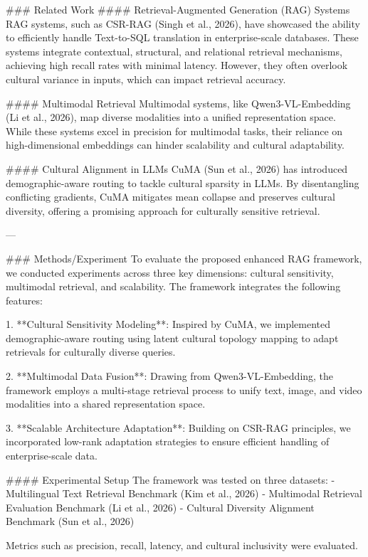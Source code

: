 ### Related Work  
#### Retrieval-Augmented Generation (RAG) Systems  
RAG systems, such as CSR-RAG (Singh et al., 2026), have showcased the ability to efficiently handle Text-to-SQL translation in enterprise-scale databases. These systems integrate contextual, structural, and relational retrieval mechanisms, achieving high recall rates with minimal latency. However, they often overlook cultural variance in inputs, which can impact retrieval accuracy.

#### Multimodal Retrieval  
Multimodal systems, like Qwen3-VL-Embedding (Li et al., 2026), map diverse modalities into a unified representation space. While these systems excel in precision for multimodal tasks, their reliance on high-dimensional embeddings can hinder scalability and cultural adaptability.

#### Cultural Alignment in LLMs  
CuMA (Sun et al., 2026) has introduced demographic-aware routing to tackle cultural sparsity in LLMs. By disentangling conflicting gradients, CuMA mitigates mean collapse and preserves cultural diversity, offering a promising approach for culturally sensitive retrieval.

---

### Methods/Experiment  
To evaluate the proposed enhanced RAG framework, we conducted experiments across three key dimensions: cultural sensitivity, multimodal retrieval, and scalability. The framework integrates the following features:  

1. **Cultural Sensitivity Modeling**:  
   Inspired by CuMA, we implemented demographic-aware routing using latent cultural topology mapping to adapt retrievals for culturally diverse queries.

2. **Multimodal Data Fusion**:  
   Drawing from Qwen3-VL-Embedding, the framework employs a multi-stage retrieval process to unify text, image, and video modalities into a shared representation space.

3. **Scalable Architecture Adaptation**:  
   Building on CSR-RAG principles, we incorporated low-rank adaptation strategies to ensure efficient handling of enterprise-scale data.

#### Experimental Setup  
The framework was tested on three datasets:  
- Multilingual Text Retrieval Benchmark (Kim et al., 2026)  
- Multimodal Retrieval Evaluation Benchmark (Li et al., 2026)  
- Cultural Diversity Alignment Benchmark (Sun et al., 2026)  

Metrics such as precision, recall, latency, and cultural inclusivity were evaluated.  

